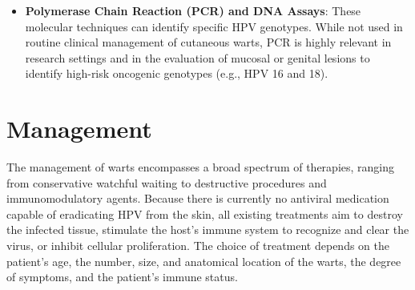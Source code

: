 \begin{itemize}
\begin{itemize}
        \item Parakeratosis (retention of nuclei in the stratum corneum), often arranged in vertical tiers
        \item Koilocytes (vacuolated keratinocytes with eccentric, pyknotic, hyperchromatic nuclei surrounded by a perinuclear halo) in the upper epidermis
        \item Large clumps of keratohyalin granules in the stratum granulosum.
    \end{itemize}
    \item \textbf{Polymerase Chain Reaction (PCR) and DNA Assays}: These molecular techniques can identify specific HPV genotypes. While not used in routine clinical management of cutaneous warts, PCR is highly relevant in research settings and in the evaluation of mucosal or genital lesions to identify high-risk oncogenic genotypes (e.g., HPV 16 and 18).
\end{itemize}

\section*{Management}
The management of warts encompasses a broad spectrum of therapies, ranging from conservative watchful waiting to destructive procedures and immunomodulatory agents. Because there is currently no antiviral medication capable of eradicating HPV from the skin, all existing treatments aim to destroy the infected tissue, stimulate the host's immune system to recognize and clear the virus, or inhibit cellular proliferation. The choice of treatment depends on the patient's age, the number, size, and anatomical location of the warts, the degree of symptoms, and the patient's immune status.

